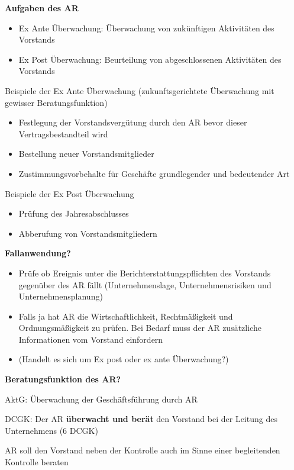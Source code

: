 \documentclass[
]{article}
\providecommand{\tightlist}{%
  \setlength{\itemsep}{0pt}\setlength{\parskip}{0pt}}
\begin{document}
\textbf{Aufgaben des AR}

\begin{itemize}
\tightlist
\item
  Ex Ante Überwachung: Überwachung von zukünftigen Aktivitäten des
  Vorstands
\item
  Ex Post Überwachung: Beurteilung von abgeschlossenen Aktivitäten des
  Vorstands
\end{itemize}

Beispiele der Ex Ante Überwachung (zukunftsgerichtete Überwachung mit
gewisser Beratungsfunktion)

\begin{itemize}
\tightlist
\item
  Festlegung der Vorstandsvergütung durch den AR bevor dieser
  Vertragsbestandteil wird
\item
  Bestellung neuer Vorstandsmitglieder
\item
  Zustimmungsvorbehalte für Geschäfte grundlegender und bedeutender Art
\end{itemize}

Beispiele der Ex Post Überwachung

\begin{itemize}
\tightlist
\item
  Prüfung des Jahresabschlusses
\item
  Abberufung von Vorstandsmitgliedern
\end{itemize}

\textbf{Fallanwendung?}

\begin{itemize}
\tightlist
\item
  Prüfe ob Ereignis unter die Berichterstattungspflichten des Vorstands
  gegenüber des AR fällt (Unternehmenslage, Unternehmensrisiken und
  Unternehmensplanung)
\item
  Falls ja hat AR die Wirtschaftlichkeit, Rechtmäßigkeit und
  Ordnungsmäßigkeit zu prüfen. Bei Bedarf muss der AR zusätzliche
  Informationen vom Vorstand einfordern
\item
  (Handelt es sich um Ex post oder ex ante Überwachung?)
\end{itemize}

\textbf{Beratungsfunktion des AR?}

AktG: Überwachung der Geschäftsführung durch AR

DCGK: Der AR \textbf{überwacht und berät} den Vorstand bei der Leitung
des Unternehmens (6 DCGK)

AR soll den Vorstand neben der Kontrolle auch im Sinne einer
begleitenden Kontrolle beraten
\end{document}
